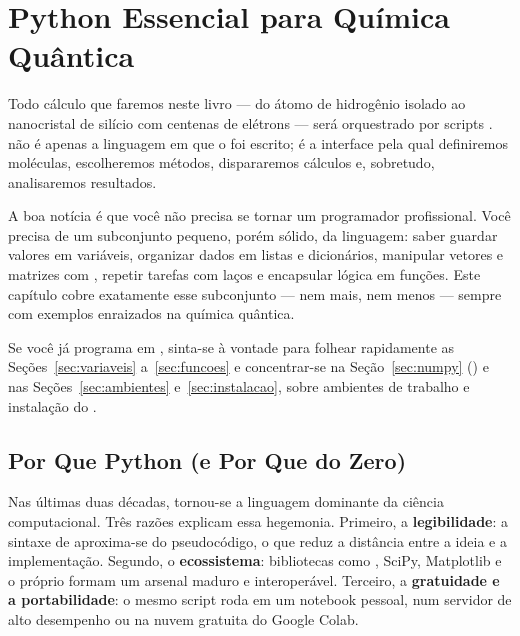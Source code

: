 \chapter{Python Essencial para Química Quântica}
\label{cap:python}

Todo cálculo que faremos neste livro --- do átomo de hidrogênio isolado ao
nanocristal de silício com centenas de elétrons --- será orquestrado por scripts
\python{}. \python{} não é apenas a linguagem em que o \pyscf{} foi escrito; é a
interface pela qual definiremos moléculas, escolheremos métodos, dispararemos
cálculos e, sobretudo, analisaremos resultados.

A boa notícia é que você não precisa se tornar um programador profissional. Você
precisa de um subconjunto pequeno, porém sólido, da linguagem: saber guardar
valores em variáveis, organizar dados em listas e dicionários, manipular vetores
e matrizes com \numpy{}, repetir tarefas com laços e encapsular lógica em
funções. Este capítulo cobre exatamente esse subconjunto --- nem mais, nem menos
--- sempre com exemplos enraizados na química quântica.

\begin{caixanota}
Se você já programa em \python{}, sinta-se à vontade para folhear rapidamente as
Seções~\ref{sec:variaveis} a~\ref{sec:funcoes} e concentrar-se na
Seção~\ref{sec:numpy} (\numpy{}) e nas Seções~\ref{sec:ambientes}
e~\ref{sec:instalacao}, sobre ambientes de trabalho e instalação do \pyscf{}.
\end{caixanota}

\section{Por Que Python (e Por Que do Zero)}

Nas últimas duas décadas, \python{} tornou-se a linguagem dominante da ciência
computacional. Três razões explicam essa hegemonia. Primeiro, a
\textbf{legibilidade}: a sintaxe de \python{} aproxima-se do pseudocódigo, o que
reduz a distância entre a ideia e a implementação. Segundo, o \textbf{ecossistema}:
bibliotecas como \numpy{}, SciPy, Matplotlib e o próprio \pyscf{} formam um arsenal
maduro e interoperável. Terceiro, a \textbf{gratuidade e a portabilidade}: o mesmo
script roda em um notebook pessoal, num servidor de alto desempenho ou na nuvem
gratuita do Google Colab.

